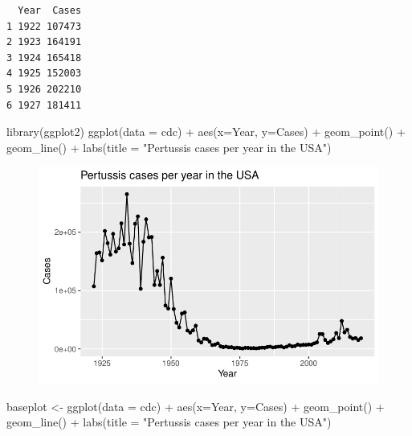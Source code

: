 \documentclass[
  letterpaper,
  DIV=11,
  numbers=noendperiod]{scrartcl}
\newenvironment{Shaded}{\begin{snugshade}}{\end{snugshade}}
\newcommand{\AttributeTok}[1]{\textcolor[rgb]{0.40,0.45,0.13}{#1}}
\newcommand{\FunctionTok}[1]{\textcolor[rgb]{0.28,0.35,0.67}{#1}}
\newcommand{\NormalTok}[1]{\textcolor[rgb]{0.00,0.23,0.31}{#1}}
\newcommand{\OtherTok}[1]{\textcolor[rgb]{0.00,0.23,0.31}{#1}}
\newcommand{\SpecialCharTok}[1]{\textcolor[rgb]{0.37,0.37,0.37}{#1}}
\newcommand{\StringTok}[1]{\textcolor[rgb]{0.13,0.47,0.30}{#1}}
\begin{document}
\begin{verbatim}
  Year  Cases
1 1922 107473
2 1923 164191
3 1924 165418
4 1925 152003
5 1926 202210
6 1927 181411
\end{verbatim}

\begin{Shaded}
\begin{Highlighting}[]
\FunctionTok{library}\NormalTok{(ggplot2)}
\FunctionTok{ggplot}\NormalTok{(}\AttributeTok{data =}\NormalTok{ cdc) }\SpecialCharTok{+} \FunctionTok{aes}\NormalTok{(}\AttributeTok{x=}\NormalTok{Year, }\AttributeTok{y=}\NormalTok{Cases) }\SpecialCharTok{+}
  \FunctionTok{geom\_point}\NormalTok{() }\SpecialCharTok{+}
  \FunctionTok{geom\_line}\NormalTok{() }\SpecialCharTok{+}
  \FunctionTok{labs}\NormalTok{(}\AttributeTok{title =} \StringTok{"Pertussis cases per year in the USA"}\NormalTok{)}
\end{Highlighting}
\end{Shaded}

\begin{figure}[H]

{\centering \includegraphics{Class19_files/figure-pdf/unnamed-chunk-2-1.pdf}

}

\end{figure}

\begin{Shaded}
\begin{Highlighting}[]
\NormalTok{baseplot }\OtherTok{\textless{}{-}} \FunctionTok{ggplot}\NormalTok{(}\AttributeTok{data =}\NormalTok{ cdc) }\SpecialCharTok{+} \FunctionTok{aes}\NormalTok{(}\AttributeTok{x=}\NormalTok{Year, }\AttributeTok{y=}\NormalTok{Cases) }\SpecialCharTok{+}
  \FunctionTok{geom\_point}\NormalTok{() }\SpecialCharTok{+}
  \FunctionTok{geom\_line}\NormalTok{() }\SpecialCharTok{+}
  \FunctionTok{labs}\NormalTok{(}\AttributeTok{title =} \StringTok{"Pertussis cases per year in the USA"}\NormalTok{)}
\end{Highlighting}
\end{Shaded}
\end{document}
